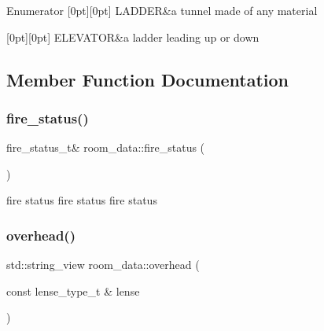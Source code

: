 \begin{DoxyEnumFields}{Enumerator}
[0pt][0pt]{}\mbox{\label{structroom__data_a9552b46091ee649079e41f04f9543b8ea5b1767f3f8b4c1c40e36fb0c4d17c1d1}} 
L\+A\+D\+D\+ER&a tunnel made of any material \\
\hline

[0pt][0pt]{}\mbox{\label{structroom__data_a9552b46091ee649079e41f04f9543b8ea73dc5c708ccbd44132d03b2ebe7db7c5}} 
E\+L\+E\+V\+A\+T\+OR&a ladder leading up or down \\
\hline

\end{DoxyEnumFields}


\subsection{Member Function Documentation}
\mbox{\label{structroom__data_a94b548a90fd4952075ab44b2622432a7}} 
\subsubsection{\texorpdfstring{fire\+\_\+status()}{fire\_status()}}
{\footnotesize\ttfamily fire\+\_\+status\+\_\+t\& room\+\_\+data\+::fire\+\_\+status (\begin{DoxyParamCaption}{ }\end{DoxyParamCaption})\hspace{0.3cm}{\ttfamily [inline]}}

fire status fire status fire status \mbox{\label{structroom__data_a2884a2a31feeab08c7e495453e354261}} 
\subsubsection{\texorpdfstring{overhead()}{overhead()}}
{\footnotesize\ttfamily std\+::string\+\_\+view room\+\_\+data\+::overhead (\begin{DoxyParamCaption}\item[{const lense\+\_\+type\+\_\+t \&}]{lense }\end{DoxyParamCaption})}

